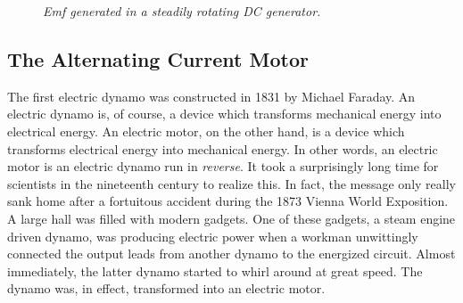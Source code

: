 \begin{figure}
\epsfysize=2.5in
\centerline{}
\caption{\em Emf generated in a steadily rotating  DC
generator.}\label{f9.9}
\end{figure}

\subsection{The Alternating Current Motor}
The first electric dynamo was constructed in 1831 by Michael Faraday. 
An electric  dynamo is, of course, a device which transforms mechanical energy into
electrical energy. An electric motor, on the other hand, is a device which
transforms electrical energy into mechanical energy. In other words, an electric
motor is an electric dynamo run in {\em reverse}. It took a surprisingly long time for
scientists in the nineteenth century to realize this. In fact, the message only
really sank home after a fortuitous accident during  the 1873 Vienna World Exposition. 
A large hall was filled with modern gadgets. One of these gadgets,
a steam engine driven
dynamo, was producing electric power when a workman unwittingly connected the
output leads from another dynamo to the energized circuit. Almost immediately,
the latter dynamo started to whirl around at great speed. The dynamo was, 
in effect, transformed into an electric motor. 

